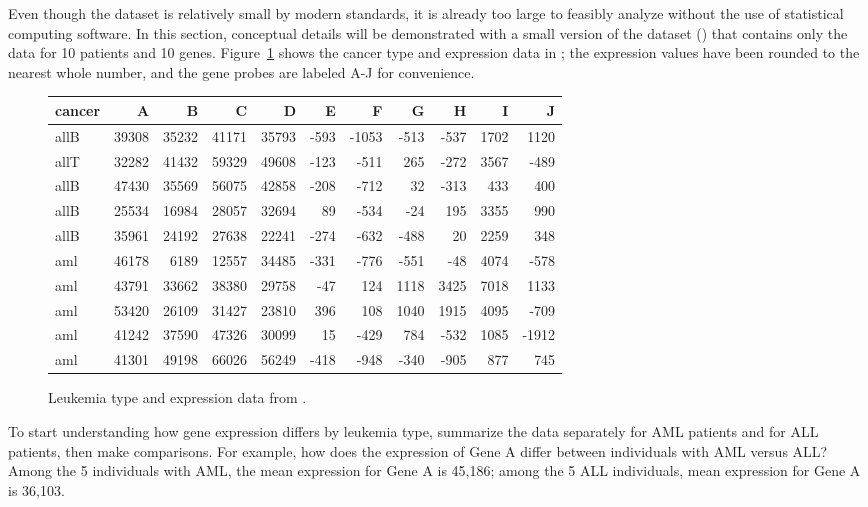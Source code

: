Even though the  dataset is relatively small by modern standards, it is already too large to feasibly analyze without the use of statistical computing software. In this section, conceptual details will be demonstrated with a small version of the dataset () that contains only the data for 10 patients and 10 genes. Figure~\ref{smallGolubData} shows the cancer type and expression data in ; the expression values have been rounded to the nearest whole number, and the gene probes are labeled A-J for convenience.

\begin{figure}[ht]
	\footnotesize
	\centering
	\begin{tabular}{lrrrrrrrrrr}
		\hline
		cancer & A & B & C & D & E & F & G & H & I & J \\ 
		\hline
		allB & 39308 & 35232 & 41171 & 35793 & -593 & -1053 & -513 & -537 & 1702 & 1120 \\ 
		allT & 32282 & 41432 & 59329 & 49608 & -123 & -511 & 265 & -272 & 3567 & -489 \\ 
		allB & 47430 & 35569 & 56075 & 42858 & -208 & -712 & 32 & -313 & 433 & 400 \\ 
		allB & 25534 & 16984 & 28057 & 32694 & 89 & -534 & -24 & 195 & 3355 & 990 \\ 
		allB & 35961 & 24192 & 27638 & 22241 & -274 & -632 & -488 & 20 & 2259 & 348 \\ 
		aml & 46178 & 6189 & 12557 & 34485 & -331 & -776 & -551 & -48 & 4074 & -578 \\ 
		aml & 43791 & 33662 & 38380 & 29758 & -47 & 124 & 1118 & 3425 & 7018 & 1133 \\ 
		aml & 53420 & 26109 & 31427 & 23810 & 396 & 108 & 1040 & 1915 & 4095 & -709 \\ 
		aml & 41242 & 37590 & 47326 & 30099 & 15 & -429 & 784 & -532 & 1085 & -1912 \\ 
		aml & 41301 & 49198 & 66026 & 56249 & -418 & -948 & -340 & -905 & 877 & 745 \\ 
		\hline
	\end{tabular}
	\caption{Leukemia type and expression data from .}
	\label{smallGolubData}
\end{figure}

\textD{\newpage}

To start understanding how gene expression differs by leukemia type, summarize the data separately for AML patients and for ALL patients, then make comparisons. For example, how does the expression of Gene A differ between individuals with AML versus ALL? Among the 5 individuals with AML, the mean expression for Gene A is 45,186; among the 5 ALL individuals, mean expression for Gene A is 36,103. 

